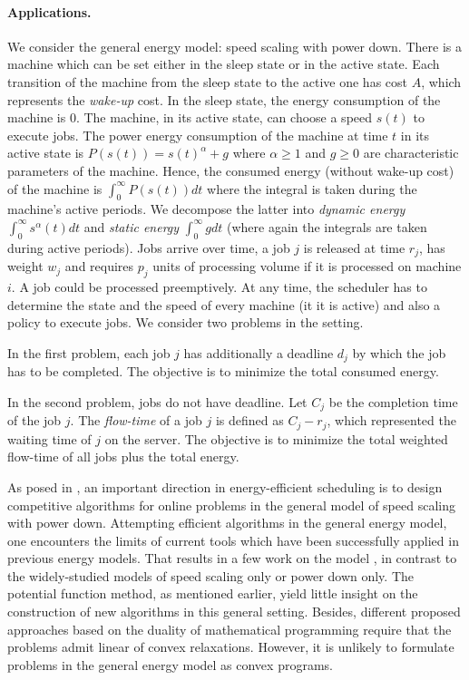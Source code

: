 \documentclass[11pt]{article}
\begin{document}
\paragraph{Applications.}
We consider the general energy model: speed scaling with power down. 
There is a machine which can be set either in the sleep state or in the active 
state. Each transition of the machine from the sleep state to the active one has 
cost $A$, which represents the \emph{wake-up} cost. 
In the sleep state, the energy consumption of the machine is 0. 
The machine, in its active state, can choose a speed $s(t)$
to execute jobs. The power energy consumption of 
the machine at time $t$ in its active state is $P(s(t)) = s(t)^{\alpha} + g$
where $\alpha \geq 1$ and $g \geq 0$ are characteristic parameters of 
the machine. Hence, the consumed energy (without wake-up cost) of the machine
is $\int_{0}^{\infty} P(s(t))dt$ where the integral is taken during the machine's 
active periods. We decompose the latter into \emph{dynamic energy} 
$\int_{0}^{\infty} s^{\alpha}(t)dt$ and \emph{static energy} 
$\int_{0}^{\infty}g dt$ (where again the integrals are taken during
active periods).
Jobs arrive over time, a job $j$ is released at time $r_{j}$, has weight $w_{j}$ 
and requires $p_{j}$ units of processing volume if it is processed 
on machine $i$. A job could be processed preemptively.
At any time, the scheduler has to determine the state and the speed of every machine (it it is active) 
and also a policy to execute jobs.
We consider two problems in the setting.

In the first problem, each job $j$ has additionally a deadline $d_{j}$ by which 
the job has to be completed. The objective is to minimize the total consumed
energy.  

In the second problem, jobs do not have deadline. Let $C_{j}$ 
be the completion time of the job $j$. 
The \emph{flow-time} of a job $j$ is defined as $C_{j} - r_{j}$, 
which represented the waiting time of $j$ on the server.
The objective is to minimize the total weighted flow-time of all jobs plus the total 
energy. 

As posed in \cite{Albers10:Energy-efficient-algorithms}, an important direction in energy-efficient scheduling
is to design competitive algorithms for online problems
in the general model of speed scaling with power down. 
Attempting efficient algorithms in the general energy model, one encounters 
the limits of current tools which have been successfully applied 
in previous energy models. That results in a few work on the model
\cite{AlbersAntoniadis12:Race-to-idle:,BampisDurr12:Speed-scaling,HanLam10:Deadline-scheduling},
in contrast to the widely-studied models of speed scaling only or power down only. 
The potential function method, as mentioned earlier, yield little insight
on the construction of new algorithms in this general setting.     
Besides, different proposed approaches based on the duality of 
mathematical programming
\cite{AnandGarg12:Resource-augmentation,GuptaKrishnaswamy12:Online-Primal-Dual,DevanurHuang14:Primal-Dual} 
require that the problems admit linear of convex relaxations. However, it is unlikely to 
formulate problems in the general energy model as convex 
programs.  
\end{document}

